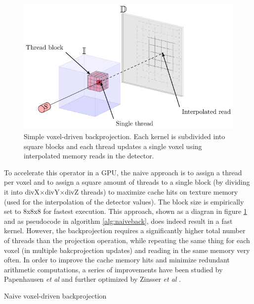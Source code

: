 \begin{figure}
\begin{center}

\includegraphics{GPUmethods/simplebackproj-figure0.pdf} 
\end{center}

\caption[Diagram of the voxel driven backproejction]{\label{fig:simpleback} Simple voxel-driven backprojection. Each kernel is subdivided into square blocks and each thread updates a single voxel using interpolated memory reads in the detector.} 
\end{figure}


To accelerate this operator in a GPU, the naive approach is to assign a thread per voxel and to assign a square amount of threads to a single block (by dividing it into divX$\times$divY$\times$divZ threads) to maximize cache hits on texture memory (used for the interpolation of the detector values). The block size is empirically set to 8x8x8 for fastest execution. This approach, shown as a diagran in figure \ref{fig:simpleback} and as pseudocode in algorithm \ref{alg:naiveback}, does indeed result in a fast kernel. However, the backprojection requires a significantly higher total number of threads than the projection operation, while repeating the same thing for each voxel (in multiple bakcprojection updates) and reading in the same memory very often. In order to improve the cache memory hits and minimize redundant arithmetic computations, a series of improvements have been studied by Papenhausen \emph{et al}\cite{papenhausen2011gpu} and further optimized by Zinsser \emph{et al} \cite{zinsser2013systematic}.

\begin{algorithm}

\caption{Naive voxel-driven backprojection
\label{alg:naiveback}}
\begin{algorithmic}[1]


\Ensure{} 
\EndFor

\end{algorithmic}

\end{algorithm}


